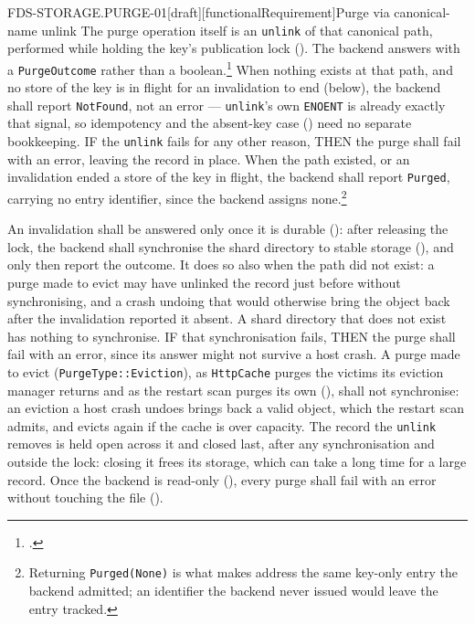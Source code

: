 \begin{requirement}{FDS-STORAGE.PURGE-01}[draft][functionalRequirement]{Purge via canonical-name unlink}
  The purge operation itself is an \texttt{unlink} of that canonical path,
  performed while holding the key's publication lock
  (). The backend answers with a
  \texttt{PurgeOutcome} rather than a boolean.\footnote{.}
  When nothing exists at that path, and no store of the key is in flight
  for an invalidation to end (below), the backend shall report
  \texttt{NotFound}, not an error --- \texttt{unlink}'s own \texttt{ENOENT} is
  already exactly that signal, so
  idempotency and the absent-key case () need
  no separate bookkeeping. IF the \texttt{unlink} fails for any other
  reason, THEN the purge shall fail with an error, leaving the record in
  place. When the path existed, or an invalidation ended a store of the key
  in flight, the backend shall report \texttt{Purged}, carrying no entry
  identifier, since the backend assigns
  none.\footnote{Returning \texttt{Purged(None)} is what makes
   address the
  same key-only entry the backend admitted; an identifier the backend never
  issued would leave the entry tracked.}

  An invalidation shall be answered only once it is durable
  (): after releasing the lock, the
  backend shall synchronise the shard directory to stable storage
  (), and only then report the
  outcome. It does so also when the path did not exist: a purge made to
  evict may have unlinked the record just before without synchronising, and
  a crash undoing that would otherwise bring the object back after the
  invalidation reported it absent. A shard directory that does not exist
  has nothing to synchronise. IF that synchronisation fails, THEN the purge
  shall fail with an error, since its answer might not survive a host
  crash. A purge made to evict (\texttt{PurgeType::Eviction}), as
  \texttt{HttpCache} purges the victims its eviction manager returns and as
  the restart scan purges its own (),
  shall not synchronise: an eviction a host crash undoes brings back a valid
  object, which the restart scan admits, and evicts again if the cache is
  over capacity. The record the \texttt{unlink} removes is held open across
  it and closed last, after any synchronisation and outside the lock:
  closing it frees its storage, which can take a long time for a large
  record. Once the backend
  is read-only (), every purge shall fail with
  an error without touching the file ().


\end{requirement}
